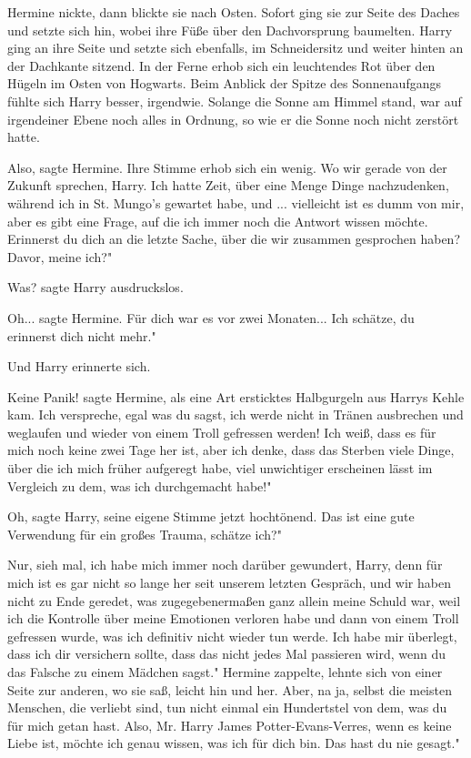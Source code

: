 Hermine nickte, dann blickte sie nach Osten. Sofort ging sie zur Seite des
Daches und setzte sich hin, wobei ihre Füße über den Dachvorsprung baumelten.
Harry ging an ihre Seite und setzte sich ebenfalls, im Schneidersitz und weiter
hinten an der Dachkante sitzend. In der Ferne erhob sich ein leuchtendes Rot
über den Hügeln im Osten von Hogwarts. Beim Anblick der Spitze des
Sonnenaufgangs fühlte sich Harry besser, irgendwie. Solange die Sonne am Himmel
stand, war auf irgendeiner Ebene noch alles in Ordnung, so wie er die Sonne noch
nicht zerstört hatte.

\glqq{}Also\grqq{}, sagte Hermine. Ihre Stimme erhob sich ein wenig. \glqq{}Wo wir
gerade von der Zukunft sprechen, Harry. Ich hatte Zeit, über eine Menge Dinge
nachzudenken, während ich in St. Mungo's gewartet habe, und ... vielleicht ist
es dumm von mir, aber es gibt eine Frage, auf die ich immer noch die Antwort
wissen möchte. Erinnerst du dich an die letzte Sache, über die wir zusammen
gesprochen haben? Davor, meine ich?"

\glqq{}Was?\grqq{} sagte Harry ausdruckslos.

\glqq{}Oh...\grqq{} sagte Hermine. \glqq{}Für dich war es vor zwei Monaten... Ich
schätze, du erinnerst dich nicht mehr."

Und Harry erinnerte sich.

\glqq{}Keine Panik!\grqq{} sagte Hermine, als eine Art ersticktes Halbgurgeln aus
Harrys Kehle kam. \glqq{}Ich verspreche, egal was du sagst, ich werde nicht in
Tränen ausbrechen und weglaufen und wieder von einem Troll gefressen werden! Ich
weiß, dass es für mich noch keine zwei Tage her ist, aber ich denke, dass das
Sterben viele Dinge, über die ich mich früher aufgeregt habe, viel unwichtiger
erscheinen lässt im Vergleich zu dem, was ich durchgemacht habe!"

\glqq{}Oh\grqq{}, sagte Harry, seine eigene Stimme jetzt hochtönend. \glqq{}Das
ist eine gute Verwendung für ein großes Trauma, schätze ich?"

\glqq{}Nur, sieh mal, ich habe mich immer noch darüber gewundert, Harry, denn für
mich ist es gar nicht so lange her seit unserem letzten Gespräch, und wir haben
nicht zu Ende geredet, was zugegebenermaßen ganz allein meine Schuld war, weil
ich die Kontrolle über meine Emotionen verloren habe und dann von einem Troll
gefressen wurde, was ich definitiv nicht wieder tun werde. Ich habe mir
überlegt, dass ich dir versichern sollte, dass das nicht jedes Mal passieren
wird, wenn du das Falsche zu einem Mädchen sagst." Hermine zappelte, lehnte sich
von einer Seite zur anderen, wo sie saß, leicht hin und her. \glqq{}Aber, na ja,
selbst die meisten Menschen, die verliebt sind, tun nicht einmal ein Hundertstel
von dem, was du für mich getan hast. Also, Mr. Harry James Potter-Evans-Verres,
wenn es keine Liebe ist, möchte ich genau wissen, was ich für dich bin. Das hast
du nie gesagt."

